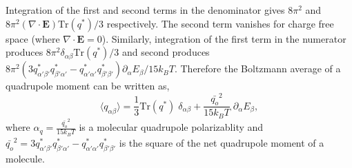 Integration of the first and second terms in the denominator gives
$8 \pi^2$ and
$8 \pi^2 ({\nabla} \cdot \mathbf{E}) \mathrm{Tr}(q^*) / 3 $
respectively. The second term vanishes for charge free space (where
${\nabla} \cdot \mathbf{E}=0$). Similarly, integration of the first
term in the numerator produces
$8 \pi^2 \delta_{\alpha\beta} \mathrm{Tr}(q^*) / 3$ and second
produces
$8 \pi^2 (3{q}^*_{\alpha'\beta'}{q}^*_{\beta'\alpha'} -
{q}^*_{\alpha'\alpha'}{q}^*_{\beta'\beta'})\partial_\alpha E_\beta /
15 k_B T $.
Therefore the Boltzmann average of a quadrupole moment can be written
as,
\begin{equation}
\langle q_{\alpha\beta} \rangle =  \frac{1}{3} \mathrm{Tr}(q^*)\;\delta_{\alpha\beta} + \frac{{\bar{q_o}}^2}{15k_BT}\;\partial_\alpha E_\beta,
\end{equation}
where $\alpha_q = \frac{{\bar{q_o}}^2}{15k_BT} $ is a molecular
quadrupole polarizablity and
${\bar{q_o}}^2=
3{q}^*_{\alpha'\beta'}{q}^*_{\beta'\alpha'}-{q}^*_{\alpha'\alpha'}{q}^*_{\beta'\beta'}$
is the square of the net quadrupole moment of a molecule.

